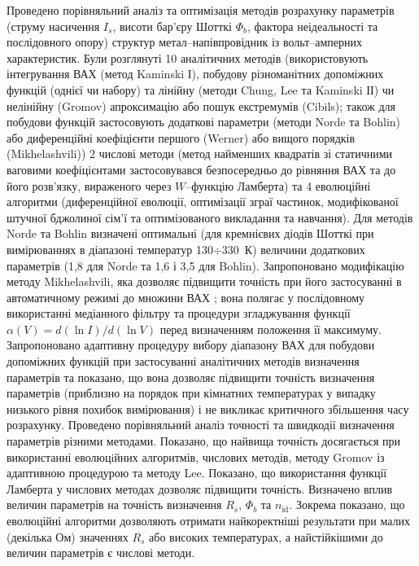 Проведено порівняльний аналіз та оптимізація методів розрахунку параметрів (струму насичення  $I_s$, висоти бар'єру Шотткі  $\Phi_b$, фактора неідеальності та послідовного опору) структур метал--напівпровідник із вольт--амперних характеристик.
Були розглянуті 10 аналітичних методів (використовують інтегрування ВАХ (метод Kaminski І), побудову різноманітних допоміжних функцій (однієї чи набору) та лінійну (методи Chung, Lee та Kaminski ІІ) чи нелінійну (Gromov) апроксимацію або пошук екстремумів (Cibils);
також для побудови функцій застосовують додаткові параметри (методи Norde та Bohlin) або диференційні коефіцієнти першого (Werner) або вищого порядків (Mikhelashvili))
2 числові методи (метод найменших квадратів зі статичними ваговими коефіцієнтами застосовувався безпосередньо до рівняння ВАХ та до його розв'язку, вираженого через $W$--функцію Ламберта) та
4 еволюційні алгоритми (диференційної еволюції,
оптимізації зграї частинок,
модифікованої штучної бджолиної сім'ї  та
оптимізованого викладання та навчання).
Для методів Norde та Bohlin визначені  оптимальні (для кремнієвих діодів Шотткі при вимірюваннях в діапазоні температур 130$\div$330~К) величини додаткових параметрів (1,8 для Norde та 1,6 і 3,5 для Bohlin).
Запропоновано модифікацію методу Mikhelashvili, яка дозволяє підвищити точність при його застосуванні в автоматичному режимі до множини ВАХ ;
вона полягає у послідовному використанні медіанного фільтру та процедури згладжування функції $\alpha(V)=d(\ln I)/d(\ln V)$ перед визначенням положення її максимуму.
Запропоновано адаптивну процедуру вибору діапазону ВАХ для побудови допоміжних функцій при застосуванні аналітичних методів визначення параметрів та показано, що вона дозволяє підвищити точність визначення параметрів (приблизно на порядок при кімнатних температурах у випадку низького рівня похибок вимірювання) і не викликає критичного збільшення часу розрахунку.
Проведено порівняльний аналіз точності  та швидкодії  визначення параметрів різними методами.
Показано, що найвища точність досягається при використанні еволюцiйних алгоритмів, числових методів, методу Gromov із адаптивною процедурою та методу Lee.
Показано, що використання функції Ламберта у числових методах дозволяє підвищити точність.
Визначено вплив величин параметрів на точність визначення $R_s$, $\Phi_b$ та $n_\mathrm{id}$.
Зокрема показано, що еволюційні алгоритми дозволяють отримати найкоректніші результати при малих (декілька Ом) значеннях $R_s$ або високих температурах, а найстійкішими до величин параметрів є числові методи.


